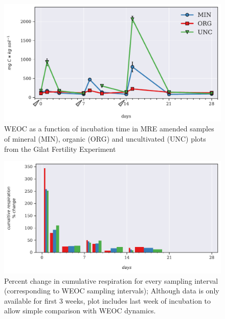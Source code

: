 %
			\begin{figure}[H]
				\centering
			\includegraphics[scale=0.8, width=\linewidth]{thesis_figures/main_incubation/MRE_treated/WEOC.pdf}
				\caption{WEOC as a function of incubation time in MRE amended samples of mineral (MIN), organic (ORG) and uncultivated (UNC) plots from the Gilat Fertility Experiment}
				\label{fig:weoc_treated_main}
			\end{figure}

			\begin{figure}[H]
				\centering
				\includegraphics[scale=0.8, width=\linewidth]{thesis_figures/main_incubation/MRE_treated/weoc_pct_change.pdf}
				\caption{Percent change in cumulative respiration for every sampling interval (corresponding to WEOC sampling intervals); Although data is only available for first 3 weeks, plot includes last week of incubation to allow simple comparison with WEOC dynamics.}
				\label{fig:weoc_pct_change_treated_main}
			\end{figure}

